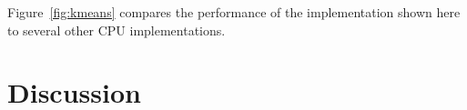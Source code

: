 Figure~\ref{fig:kmeans} compares the performance of the implementation shown
here to several other CPU implementations.

\section{Discussion}

%

